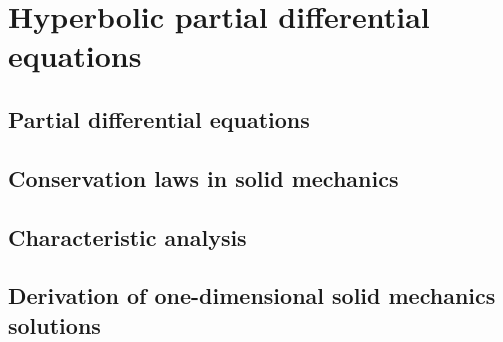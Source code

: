 \chapter{Hyperbolic partial differential equations}
\newpage
\section{Partial differential equations}
\label{sec:PDEs}


\section{Conservation laws in solid mechanics}
\label{sec:solidMech_equations}



\section{Characteristic analysis}
\label{sec:characteristic_analysis}
%


\section{Derivation of one-dimensional solid mechanics solutions}
\label{sec:analytical_results}
%




